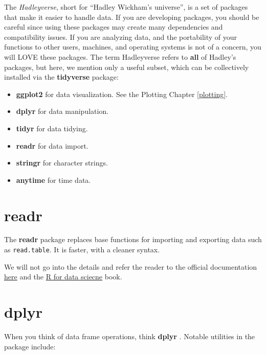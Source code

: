\documentclass[]{book}
\providecommand{\tightlist}{%
  \setlength{\itemsep}{0pt}\setlength{\parskip}{0pt}}
\theoremstyle{definition}
\theoremstyle{definition}
\theoremstyle{remark}
\begin{document}
The \emph{Hadleyverse}, short for ``Hadley Wickham's universe'', is a
set of packages that make it easier to handle data. If you are
developing packages, you should be careful since using these packages
may create many dependencies and compatibility issues. If you are
analyzing data, and the portability of your functions to other users,
machines, and operating systems is not of a concern, you will LOVE these
packages. The term Hadleyverse refers to \textbf{all} of Hadley's
packages, but here, we mention only a useful subset, which can be
collectively installed via the \textbf{tidyverse} package:

\begin{itemize}
\tightlist
\item
  \textbf{ggplot2} for data visualization. See the Plotting Chapter
  \ref{plotting}.
\item
  \textbf{dplyr} for data manipulation.
\item
  \textbf{tidyr} for data tidying.
\item
  \textbf{readr} for data import.
\item
  \textbf{stringr} for character strings.
\item
  \textbf{anytime} for time data.
\end{itemize}

\section{readr}\label{readr}

The \textbf{readr} package \citep{readr} replaces base functions for
importing and exporting data such as \texttt{read.table}. It is faster,
with a cleaner syntax.

We will not go into the details and refer the reader to the official
documentation
\href{http://readr.tidyverse.org/articles/readr.html}{here} and the
\href{http://r4ds.had.co.nz/data-import.html}{R for data sciecne} book.

\section{dplyr}\label{dplyr}

When you think of data frame operations, think \textbf{dplyr}
\citep{dplyr}. Notable utilities in the package include:
\end{document}
